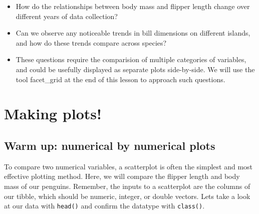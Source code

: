 \documentclass[
  letterpaper,
  DIV=11,
  numbers=noendperiod]{scrreprt}
\newenvironment{Shaded}{\begin{snugshade}}{\end{snugshade}}
\newcommand{\FunctionTok}[1]{\textcolor[rgb]{0.28,0.35,0.67}{#1}}
\newcommand{\NormalTok}[1]{\textcolor[rgb]{0.00,0.23,0.31}{#1}}
\newcommand{\SpecialCharTok}[1]{\textcolor[rgb]{0.37,0.37,0.37}{#1}}
\begin{document}
\begin{tcolorbox}[enhanced jigsaw, left=2mm, colframe=quarto-callout-note-color-frame, leftrule=.75mm, opacitybacktitle=0.6, toptitle=1mm, title=\textcolor{quarto-callout-note-color}{\faInfo}\hspace{0.5em}{Note}, opacityback=0, coltitle=black, colbacktitle=quarto-callout-note-color!10!white, breakable, colback=white, titlerule=0mm, bottomrule=.15mm, arc=.35mm, bottomtitle=1mm, rightrule=.15mm, toprule=.15mm]

\begin{itemize}
\item
  How do the relationships between body mass and flipper length change
  over different years of data collection?
\item
  Can we observe any noticeable trends in bill dimensions on different
  islands, and how do these trends compare across species?
\item
  These questions require the comparision of multiple categories of
  variables, and could be usefully displayed as separate plots
  side-by-side. We will use the tool facet\_grid at the end of this
  lesson to approach such questions.
\end{itemize}

\end{tcolorbox}

\hypertarget{making-plots}{%
\section{Making plots!}\label{making-plots}}

\hypertarget{warm-up-numerical-by-numerical-plots}{%
\subsection{Warm up: numerical by numerical
plots}\label{warm-up-numerical-by-numerical-plots}}

To compare two numerical variables, a scatterplot is often the simplest
and most effective plotting method. Here, we will compare the flipper
length and body mass of our penguins. Remember, the inputs to a
scatterplot are the columns of our tibble, which should be numeric,
integer, or double vectors. Lets take a look at our data with
\texttt{head()} and confirm the datatype with \texttt{class()}.

\begin{Shaded}
\end{Shaded}
\end{document}
